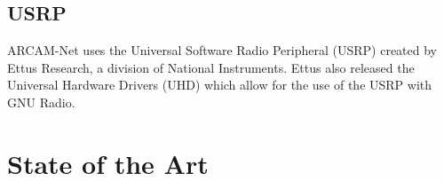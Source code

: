 \subsection{USRP}

ARCAM-Net uses the Universal Software Radio Peripheral (USRP) created by Ettus Research, a division of National Instruments\cite{0006}. Ettus also released the Universal Hardware Drivers (UHD) \cite{0007} which allow for the use of the USRP with GNU Radio.


\section{State of the Art}

